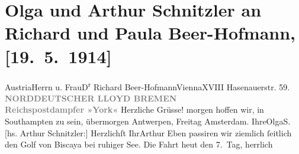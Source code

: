 

         
         \renewcommand{\erwaehntePersonen}{Personen: Richard Beer-Hofmann, Paula Beer-Hofmann, Olga Schnitzler}
         \renewcommand{\erwaehnteInstitutionen}{Institutionen: Norddeutscher Lloyd}
         \renewcommand{\erwaehnteOrte}{Orte: Amsterdam, Antwerpen, Biskaya, Hasenauerstraße, Southampton, Wien, Österreich}
         \renewcommand{\erwaehnteWerke}{}
               \section[Olga und Arthur Schnitzler an Richard und Paula Beer-Hofmann, {[}19. 5. 1914{]}]{ Olga und Arthur Schnitzler an Richard und Paula Beer-Hofmann,
               {[}19. 5. 1914{]}}\nopagebreak{}\rehead{ }\begin{ledgroupsized}[t]{13cm}\normalsize\beginnumbering \toendnotes[C]{\smallbreak\pagebreak[2]} 
\pstart{}{\pb}Austria\pend{}\pstart{}Herrn u. Frau\pend{}\pstart{}D\textsuperscript{r} Richard Beer-Hofmann\pend{}\pstart{}Vienna\pend{}\pstart{}XVIII Hasenauerstr. 59.\pend{}{\bigskip}\pstart
           \noindent{}\centering{}{\pb}\textcolor{gray}{\textbf{NORDDEUTSCHER LLOYD BREMEN}}{\\}\textcolor{gray}{\textbf{Reichspostdampfer »York«}}\pend
           \pstart
           \noindent{}{\pb}Herzliche Grüsse!\pend
           \pstart
           morgen hoffen wir, in Southampten zu sein,
               übermorgen Antwerpen, Freitag{ }Amsterdam.\pend
           \pstart Ihre\spacefill\mbox{OlgaS.}\pend{}\pstart
           {\pb}{[}hs. Arthur Schnitzler:{]} Herzlichſt Ihr\spacefill\mbox{Arthur}\pend
           \pstart
           Eben passiren wir ziemlich ſeitlich den Golf von
                  Biscaya bei ruhiger See.\pend
           \pstart
           Die Fahrt heut den 7. Tag, herrlich\pend
           

\end{ledgroupsized}
